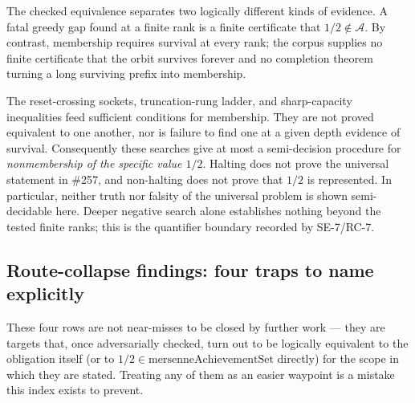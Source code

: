 \begin{thm}
The checked equivalence
separates two logically different kinds of evidence. A fatal greedy gap found at a finite rank is
a finite certificate that $1/2\notin\mathcal A$. By contrast, membership requires survival at
every rank; the corpus supplies no finite certificate that the orbit survives forever and no
completion theorem turning a long surviving prefix into membership.

The reset-crossing sockets, truncation-rung ladder, and sharp-capacity inequalities feed
sufficient conditions for membership. They are not proved equivalent to one another,
nor is failure to find one at a given depth evidence of survival. Consequently these searches
give at most a semi-decision procedure for \emph{nonmembership of the specific value $1/2$}.
Halting does not prove the universal statement in \#257, and non-halting does not prove that
$1/2$ is represented. In particular, neither truth nor falsity of the universal problem is
shown semi-decidable here. Deeper negative search alone establishes nothing beyond the tested
finite ranks; this is the quantifier boundary recorded by SE-7/RC-7.
\end{thm}

\subsection{Route-collapse findings: four traps to name explicitly}

These four rows are not near-misses to be closed by further work — they are targets that, once
adversarially checked, turn out to be logically equivalent to the obligation itself (or to
$1/2\in\mathrm{mersenneAchievementSet}$ directly) for the scope in which they are stated. Treating
any of them as an easier waypoint is a mistake this index exists to prevent.

